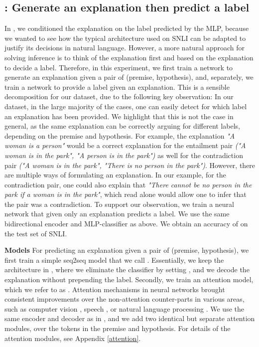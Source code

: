 \subsection{\exptwo{}: Generate an explanation then predict a label}

In \expone, we conditioned the explanation on the label predicted by the MLP, because we wanted to see how the typical architecture used on SNLI can be adapted to justify its decisions in natural language. However, a more natural approach for solving inference is to think of the explanation first and based on the explanation to decide a label. Therefore, in this experiment, we first train a network to generate an explanation given a pair of (premise, hypothesis), and, separately, we train a network to provide a label given an explanation. This is a sensible decomposition for our dataset, due to the following key observation: In our dataset, in the large majority of the cases, one can easily detect for which label an explanation has been provided. We highlight that this is not the case in general, as the same explanation can be correctly arguing for different labels, depending on the premise and hypothesis. For example, the explanation \textit{"A woman is a person"} would be a correct explanation for the entailment pair \textit{("A woman is in the park", "A person is in the park")} as well for the contradiction pair \textit{("A woman is in the park", "There is no person in the park")}. However, there are multiple ways of formulating an explanation. In our example, for the contradiction pair, one could also explain that \textit{"There cannot be no person in the park if a woman is in the park"}, which read alone would allow one to infer that the pair was a contradiction. To support our observation, we train a neural network that given only an explanation predicts a label. We use the same bidirectional encoder and MLP-classifier as above. We obtain an accuracy of  on the test set of SNLI.  


\textbf{Models   } For predicting an explanation given a pair of (premise, hypothesis), we first train a simple seq2seq model that we call \exptwoseqtoseq. Essentially, we keep the architecture in \eInferSent{}, where we eliminate the classifier by setting , and we decode the explanation without prepending the label. Secondly, we train an attention model, which we refer to as \exptwoattention. Attention mechanisms in neural networks brought consistent improvements over the non-attention counter-parts in various areas, such as computer vision \cite{showattend}, speech \cite{listenattend}, or natural language processing \cite{best-attention, BahdanauCB14}. We use the same encoder and decoder as in \exptwoseqtoseq, and we add two identical but separate attention modules, over the tokens in the premise and hypothesis. For details of the attention modules, see Appendix \ref{attention}.



